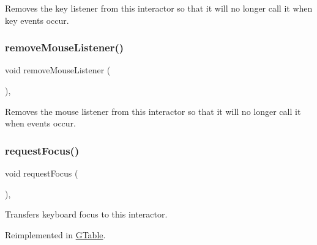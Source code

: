 Removes the key listener from this interactor so that it will no longer call it when key events occur. 

\mbox{\label{classsgl_1_1GInteractor_aff47f71ce47e688a07c9d38dc92fcc11}} 
\subsubsection{\texorpdfstring{remove\+Mouse\+Listener()}{removeMouseListener()}}
{\footnotesize\ttfamily void remove\+Mouse\+Listener (\begin{DoxyParamCaption}{ }\end{DoxyParamCaption})\hspace{0.3cm}{\ttfamily [virtual]}, {\ttfamily [inherited]}}



Removes the mouse listener from this interactor so that it will no longer call it when events occur. 

\mbox{\label{classsgl_1_1GInteractor_a519fb2ac767f8b2febbb50b898b8c8cb}} 
\subsubsection{\texorpdfstring{request\+Focus()}{requestFocus()}}
{\footnotesize\ttfamily void request\+Focus (\begin{DoxyParamCaption}{ }\end{DoxyParamCaption})\hspace{0.3cm}{\ttfamily [virtual]}, {\ttfamily [inherited]}}



Transfers keyboard focus to this interactor. 



Reimplemented in \mbox{\hyperlink{classsgl_1_1GTable_a5921efd0a5a83eacebdadb749fb3ea7a}{G\+Table}}.

\mbox{\label{classsgl_1_1GInteractor_ad15f102f62e2960576012f1aa0ba4b2e}} 
